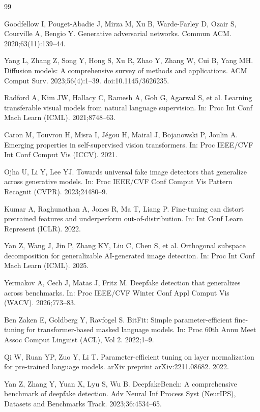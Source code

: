 \begin{thebibliography}{99}
\balance

Goodfellow I, Pouget-Abadie J, Mirza M, Xu B, Warde-Farley D, Ozair S, Courville A, Bengio Y.
Generative adversarial networks.
Commun ACM. 2020;63(11):139--44.

Yang L, Zhang Z, Song Y, Hong S, Xu R, Zhao Y, Zhang W, Cui B, Yang MH.
Diffusion models: A comprehensive survey of methods and applications.
ACM Comput Surv. 2023;56(4):1--39. doi:10.1145/3626235.

Radford A, Kim JW, Hallacy C, Ramesh A, Goh G, Agarwal S, et al.
Learning transferable visual models from natural language supervision.
In: Proc Int Conf Mach Learn (ICML). 2021;8748--63.

Caron M, Touvron H, Misra I, J{\'e}gou H, Mairal J, Bojanowski P, Joulin A.
Emerging properties in self-supervised vision transformers.
In: Proc IEEE/CVF Int Conf Comput Vis (ICCV). 2021.

Ojha U, Li Y, Lee YJ.
Towards universal fake image detectors that generalize across generative models.
In: Proc IEEE/CVF Conf Comput Vis Pattern Recognit (CVPR). 2023;24480--9.

Kumar A, Raghunathan A, Jones R, Ma T, Liang P.
Fine-tuning can distort pretrained features and underperform out-of-distribution.
In: Int Conf Learn Represent (ICLR). 2022.

Yan Z, Wang J, Jin P, Zhang KY, Liu C, Chen S, et al.
Orthogonal subspace decomposition for generalizable AI-generated image detection.
In: Proc Int Conf Mach Learn (ICML). 2025.

Yermakov A, Cech J, Matas J, Fritz M.
Deepfake detection that generalizes across benchmarks.
In: Proc IEEE/CVF Winter Conf Appl Comput Vis (WACV). 2026;773--83.

Ben Zaken E, Goldberg Y, Ravfogel S.
BitFit: Simple parameter-efficient fine-tuning for transformer-based masked language models.
In: Proc 60th Annu Meet Assoc Comput Linguist (ACL), Vol 2. 2022;1--9.

Qi W, Ruan YP, Zuo Y, Li T.
Parameter-efficient tuning on layer normalization for pre-trained language models.
arXiv preprint arXiv:2211.08682. 2022.

Yan Z, Zhang Y, Yuan X, Lyu S, Wu B.
DeepfakeBench: A comprehensive benchmark of deepfake detection.
Adv Neural Inf Process Syst (NeurIPS), Datasets and Benchmarks Track. 2023;36:4534--65.


\end{thebibliography}
